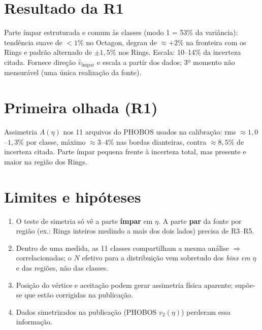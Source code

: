 \documentclass[11pt,a4paper]{article}
\begin{document}
\section*{Resultado da R1}
Parte ímpar estruturada e comum às classes (modo 1 = 53\% da variância): tendência suave de $<1\%$ no Octagon, degrau de $\approx+2\%$ na
fronteira com os Rings e padrão alternado de $\pm1{,}5\%$ nos Rings. Escala: 10--14\% da incerteza citada. Fornece direção $\hat v_{\mathrm{ímpar}}$
e escala a partir dos dados; 3º momento não mensurável (uma única realização da fonte).

\section*{Primeira olhada (R1)}
Assimetria $A(\eta)$ nos 11 arquivos do PHOBOS usados na calibração: rms $\approx1{,}0$--$1{,}3\%$ por classe, máximo
$\approx3$--$4\%$ nas bordas dianteiras, contra $\approx8{,}5\%$ de incerteza citada. Parte ímpar pequena frente à incerteza total,
mas presente e maior na região dos Rings.

\section*{Limites e hipóteses}
\begin{enumerate}[nosep]
\item O teste de simetria só vê a parte \textbf{ímpar} em $\eta$. A parte \textbf{par} da fonte por região (ex.: Rings inteiros
medindo a mais dos dois lados) precisa de R3--R5.
\item Dentro de uma medida, as 11 classes compartilham a mesma análise $\Rightarrow$ correlacionadas; o $N$ efetivo para a
distribuição vem sobretudo dos \emph{bins em $\eta$} e das regiões, não das classes.
\item Posição do vértice e aceitação podem gerar assimetria física aparente; supõe-se que estão corrigidas na publicação.
\item Dados simetrizados na publicação (PHOBOS $v_2(\eta)$) perderam essa informação.
\end{enumerate}
\end{document}

